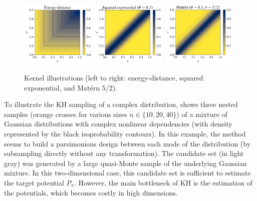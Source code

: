 \begin{figure}[!h]
\begin{center}
    \includegraphics[width=0.32\textwidth]{part2/figures/DCE/numerical_experiments/energy_kernel.jpg}
    \includegraphics[width=0.32\textwidth]{part2/figures/DCE/numerical_experiments/gaussian_kernel.jpg}
    \includegraphics[width=0.32\textwidth]{part2/figures/DCE/numerical_experiments/matern_kernel.jpg}
\end{center}
\caption{Kernel illustrations (left to right: energy-distance, squared exponential, and Mat\'{e}rn $5/2$).} \label{fig:kernels}
\end{figure}

To illustrate the KH sampling of a complex distribution,  shows three nested samples (orange crosses for various sizes $n\in\{10, 20, 40\}$) of a mixture of Gaussian distributions with complex nonlinear dependencies (with density represented by the black isoprobability contours). 
In this example, the method seems to build a parsimonious design between each mode of the distribution (by subsampling directly without any transformation). 
The candidate set (in light gray) was generated by a large quasi-Monte sample of the underlying Gaussian mixture. 
In this two-dimensional case, this candidate set is sufficient to estimate the target potential $P_{\pi}$. 
However, the main bottleneck of KH is the estimation of the potentials, which becomes costly in high dimensions.

